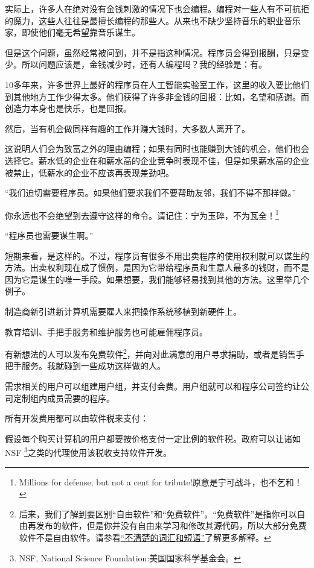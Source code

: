 \documentclass{book}
\begin{document}
实际上，许多人在绝对没有金钱刺激的情况下也会编程。编程对一些人有不可抗拒的魔力，这些人往往是最擅长编程的那些人。从来也不缺少坚持音乐的职业音乐家，即使他们毫无希望靠音乐谋生。\par
但是这个问题，虽然经常被问到，并不是指这种情况。程序员会得到报酬，只是变少。所以问题应该是，金钱减少时，还有人编程吗？我的经验是：有。\par
10多年来，许多世界上最好的程序员在人工智能实验室工作，这里的收入要比他们到其他地方工作少得太多。他们获得了许多非金钱的回报：比如，名望和感谢。而创造力本身也是快乐，也是回报。\par
然后，当有机会做同样有趣的工作并赚大钱时，大多数人离开了。\par
这说明人们会为致富之外的理由编程；如果有同时也能赚到大钱的机会，他们也会选择它。薪水低的企业在和薪水高的企业竞争时表现不佳，但是如果薪水高的企业被禁止，低薪水的企业不应该再表现差劲吧。\par
“我们迫切需要程序员。如果他们要求我们不要帮助友邻，我们不得不那样做。”\par
你永远也不会绝望到去遵守这样的命令。请记住：宁为玉碎，不为瓦全！\footnote{Millions for defense, but not a cent for tribute!原意是宁可战斗，也不乞和！}\par
“程序员也需要谋生啊。”\par
短期来看，是这样的。不过，程序员有很多不用出卖程序的使用权利就可以谋生的方法。出卖权利现在成了惯例，是因为它带给程序员和生意人最多的钱财，而不是因为它是谋生的唯一手段。如果想要，我们能够轻易找到其他的方法。这里举几个例子。\par
制造商新引进新计算机需要雇人来把操作系统移植到新硬件上。\par
教育培训、手把手服务和维护服务也可能雇佣程序员。\par
有新想法的人可以发布免费软件\footnote{后来，我们了解到要区别“自由软件”和“免费软件”。“免费软件”是指你可以自由再发布的软件，但是你并没有自由来学习和修改其源代码，所以大部分免费软件不是自由软件。请参看\href{http://www.gnu.org/philosophy/words-to-avoid.html\#GiveAwaySoftware}{“不清楚的词汇和短语”}了解更多解释。}，并向对此满意的用户寻求捐助，或者是销售手把手服务。我就碰到一些成功这样做的人。\par
需求相关的用户可以组建用户组，并支付会费。用户组就可以和程序公司签约让公司定制组内成员需要的程序。\par
所有开发费用都可以由软件税来支付：\par
假设每个购买计算机的用户都要按价格支付一定比例的软件税。政府可以让诸如NSF \footnote{NSF, National Science Foundation:美国国家科学基金会。}之类的代理使用该税收支持软件开发。\par
\end{document}
